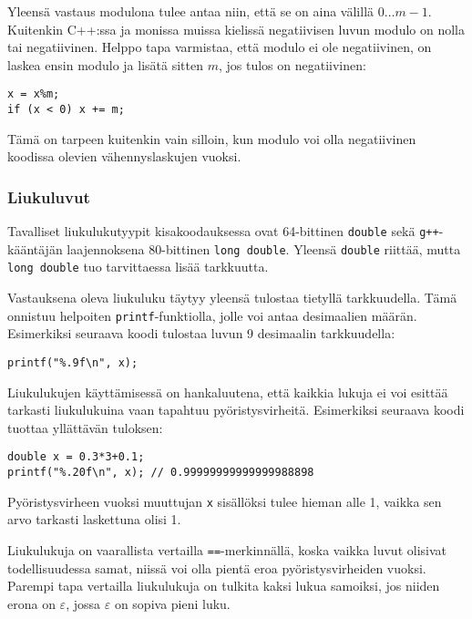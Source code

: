 Yleensä vastaus modulona tulee antaa niin,
että se on aina välillä $0\ldots m-1$.
Kuitenkin C++:ssa ja monissa
muissa kielissä negatiivisen
luvun modulo on nolla tai negatiivinen.
Helppo tapa varmistaa, että modulo ei ole negatiivinen,
on laskea ensin modulo ja lisätä sitten $m$,
jos tulos on negatiivinen:
\begin{lstlisting}
x = x%m;
if (x < 0) x += m;
\end{lstlisting}
Tämä on tarpeen kuitenkin vain silloin,
kun modulo voi olla negatiivinen
koodissa olevien vähennyslaskujen vuoksi.

\subsubsection{Liukuluvut}


Tavalliset liukulukutyypit kisakoodauksessa
ovat 64-bittinen \texttt{double}
sekä \texttt{g++}-kääntäjän
laajennoksena
80-bittinen \texttt{long double}.
Yleensä \texttt{double} riittää,
mutta \texttt{long double} tuo tarvittaessa
lisää tarkkuutta.

Vastauksena oleva liukuluku täytyy yleensä tulostaa
tietyllä tarkkuudella.
Tämä onnistuu helpoiten \texttt{printf}-funktiolla,
jolle voi antaa desimaalien määrän.
Esimerkiksi seuraava koodi tulostaa luvun 9
desimaalin tarkkuudella:

\begin{lstlisting}
printf("%.9f\n", x);
\end{lstlisting}

Liukulukujen käyttämisessä on hankaluutena,
että kaikkia lukuja ei voi esittää tarkasti
liukulukuina vaan tapahtuu pyöristysvirheitä.
Esimerkiksi seuraava koodi tuottaa yllättävän tuloksen:

\begin{lstlisting}
double x = 0.3*3+0.1;
printf("%.20f\n", x); // 0.99999999999999988898
\end{lstlisting}

Pyöristysvirheen vuoksi muuttujan \texttt{x}
sisällöksi tulee hieman alle 1,
vaikka sen arvo tarkasti laskettuna olisi 1.

Liukulukuja on vaarallista vertailla \texttt{==}-merkinnällä,
koska vaikka luvut olisivat todellisuudessa samat,
niissä voi olla pientä eroa pyöristysvirheiden vuoksi.
Parempi tapa vertailla liukulukuja on
tulkita kaksi lukua samoiksi, jos niiden erona on $\varepsilon$,
jossa $\varepsilon$ on sopiva pieni luku.


